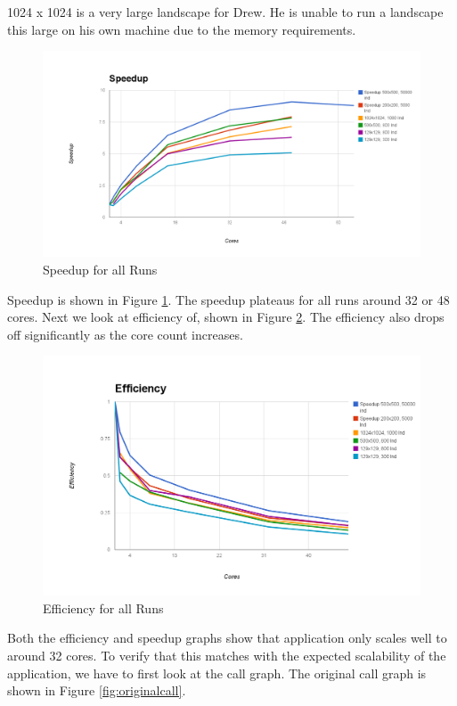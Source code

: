 \documentclass[12pt, notitlepage]{article}
\begin{document}
1024 x 1024 is a very large landscape for Drew.  He is unable to run a landscape this large on his own machine due to the memory requirements.

\begin{figure}[ht]
\includegraphics[width=\textwidth]{Include/SpeedupRuns.png}
\caption{Speedup for all Runs} \label{fig:speedup}
\end{figure}


Speedup is shown in Figure \ref{fig:speedup}.  The speedup plateaus for all runs around 32 or 48 cores.  Next we look at efficiency of, shown in Figure \ref{fig:efficiency}.  The efficiency also drops off significantly as the core count increases.

\begin{figure}[ht]
\includegraphics[width=\textwidth]{Include/Efficiency.png}
\caption{Efficiency for all Runs} \label{fig:efficiency}
\end{figure}


Both the efficiency and speedup graphs show that application only scales well to around 32 cores.  To verify that this matches with the expected scalability of the application, we have to first look at the call graph.  The original call graph is shown in Figure \ref{fig:originalcall}.
\end{document}
